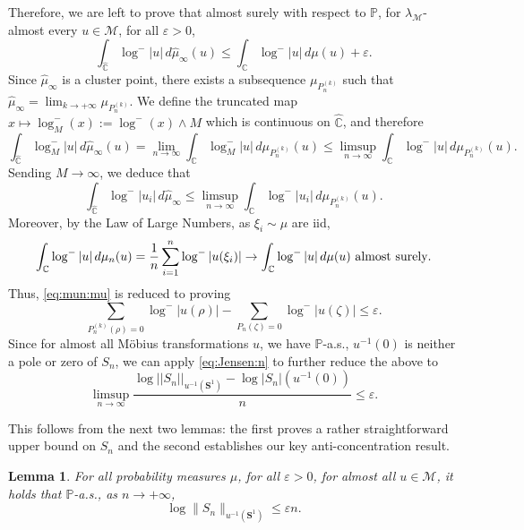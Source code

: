 \documentclass[12pt, reqno]{amsart}
\theoremstyle{plain}
\newtheorem{lemma}[theorem]{Lemma}
\theoremstyle{definition}
\newcommand\C{{\mathbb{C}}}
\renewcommand\P{{\mathbb{P}}}
\newcommand{\ep}{\varepsilon}
\begin{document}
 Therefore, we are left to prove that almost surely with respect to $\P$, for $\lambda_{\mathcal{M}}$-almost every $u \in \mathcal{M}$, for all $\ep>0$,
 \begin{equation}
 	\int_{\widehat{\C}} \log^- |u|\, d\widehat{\mu}_\infty(u) \le \int_{\C} \log^- |u|\, d\mu(u) + \ep. \label{eq:mun:mu}
 \end{equation}
 Since $\widehat{\mu}_\infty$ is a cluster point, there exists a subsequence $\mu_{P_n^{(k)}}$ such that 
 $\widehat{\mu}_\infty = \lim_{k \to +\infty} \mu_{P_n^{(k)}}$.  
 We define the truncated map $x\mapsto \log^-_M(x) := \log^-(x) \wedge M$ which is continuous on $\widehat{\mathbb{C}}$, and therefore
 \[
 \int_{\widehat{\mathbb{C}}} \log^-_M |u| \, d\widehat{\mu}_\infty (u) 
 = \lim_{n \to \infty} \int_{\mathbb{C}} \log^-_M |u| \, d\mu_{P_n^{(k)}}(u)
 \le \limsup_{n \to \infty} \int_{\mathbb{C}} \log^- |u| \, d\mu_{P_n^{(k)}}(u).
 \]
 Sending $M \to \infty$, we deduce that
 \begin{equation}
 	\int_{\widehat{\mathbb{C}}} \log^- |u_i| \, d\widehat{\mu}_\infty
 	\le \limsup_{n \to \infty} \int_{\mathbb{C}} \log^- |u_i| \, d\mu_{P_n^{(k)}}(u). \label{eq:limsup}
 \end{equation}
 Moreover, by the Law of Large Numbers, as $\xi_i\sim \mu$ are iid,
 \begin{equation}
 	\int_{{\C}} \log^- |u|\, d\mu_n(u) = \frac1n\sum_{i=1}^{n} \log^-|u(\xi_i)|\to \int_{\C} \log^- |u|\, d\mu(u) \text{ almost surely}.  \notag
 \end{equation}
 Thus, \eqref{eq:mun:mu} is reduced to proving
 $$ \sum_{P_n^{(k)}(\rho)=0} \log^{-} |u(\rho)| - 	\sum_{P_n(\zeta)=0} \log^{-} |u(\zeta)|\le   \ep.$$
 Since for almost all Möbius transformations $u$, we have $\P$-a.s., $u^{-1}(0)$ is neither a pole or zero of $S_n$, we can apply \eqref{eq:Jensen:n} to further reduce the above to
 \begin{equation}\label{eq:S:u}
 	\limsup_{n\to \infty} \frac{\log||S_n||_{u^{-1}(\mathbf S^1)} - \log |S_n|(u^{-1}(0))}{n}\le \ep.
 \end{equation}
 
 This follows from the next two lemmas: the first proves a rather straightforward upper bound on $S_n$ and the second establishes our key anti-concentration result.
 \begin{lemma} \label{lm:upper}
 	For all probability measures $\mu$, for all $\ep>0$, for almost all $u\in \mathcal M$, it holds that $\P$-a.s., as $n \to +\infty$,
 	$$\log \|S_n\|_{u^{-1}(\mathbf S^1)} \le \ep n.$$
 \end{lemma}
 
\end{document}

